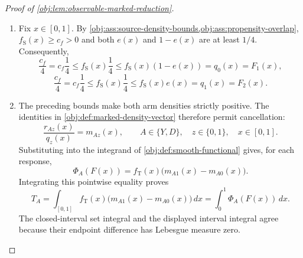 \documentclass[11pt]{article}
\begin{document}
\begin{proof}[Proof of \cref{obj:lem:observable-marked-reduction}]
\begin{enumerate}
For either response \(A\in\{Y,D\}\), restriction by the same indicator and the source arm-moment identity in \cref{obj:ass:arm-means-holder} give
\[
\begin{aligned}
\int_{\{X\in B\}}\mathbf 1_{\{Z=z\}}A\,dP_{\mathrm S}
&=\int_{\{X\in B,\;Z=z\}}A\,dP_{\mathrm S}\\
&=\int_B f_{\mathrm S}(x)\pi_z(x)m_{Az}(x)\,dx
=\int_B r_{Az}(x)\,dx.
\end{aligned}
\]
Applying this identity first to \(Y\) in arms \(0,1\), and then to \(D\) in arms \(0,1\), yields respectively
\[
\begin{aligned}
\int_B F_3(x)\,dx&=\int_{\{X\in B\}}(1-Z)Y\,dP_{\mathrm S},&
\int_B F_4(x)\,dx&=\int_{\{X\in B\}}ZY\,dP_{\mathrm S},\\
\int_B F_5(x)\,dx&=\int_{\{X\in B\}}(1-Z)D\,dP_{\mathrm S},&
\int_B F_6(x)\,dx&=\int_{\{X\in B\}}ZD\,dP_{\mathrm S}.
\end{aligned}
\]
These arguments apply also when \(B\) is empty.

\item Fix \(x\in[0,1]\). By
\cref{obj:ass:source-density-bounds,obj:ass:propensity-overlap},
\(f_{\mathrm S}(x)\ge c_f>0\) and both \(e(x)\) and \(1-e(x)\) are at least \(1/4\). Consequently,
\[
\frac{c_f}{4}
=c_f\frac14
\le f_{\mathrm S}(x)\frac14
\le f_{\mathrm S}(x)(1-e(x))
=q_0(x)=F_1(x),
\]
\[
\frac{c_f}{4}
=c_f\frac14
\le f_{\mathrm S}(x)\frac14
\le f_{\mathrm S}(x)e(x)
=q_1(x)=F_2(x).
\]

\item The preceding bounds make both arm densities strictly positive. The identities in \cref{obj:def:marked-density-vector} therefore permit cancellation:
\[
\frac{r_{Az}(x)}{q_z(x)}=m_{Az}(x),
\qquad A\in\{Y,D\},\quad z\in\{0,1\},\quad x\in[0,1].
\]
Substituting into the integrand of \cref{obj:def:smooth-functional} gives, for each response,
\[
\Phi_A(F(x))
=f_{\mathrm T}(x)\bigl(m_{A1}(x)-m_{A0}(x)\bigr).
\]
Integrating this pointwise equality proves
\[
T_A
=\int_{[0,1]}f_{\mathrm T}(x)
       \bigl(m_{A1}(x)-m_{A0}(x)\bigr)\,dx
=\int_0^1\Phi_A(F(x))\,dx.
\]
The closed-interval set integral and the displayed interval integral agree because their endpoint difference has Lebesgue measure zero.


\end{enumerate}
\end{proof}
\end{document}
